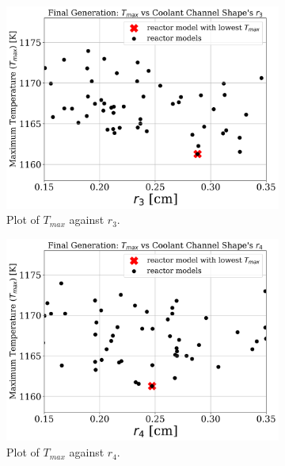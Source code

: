 \begin{frame}
\begin{figure}
\begin{subfigure}{0.3\textwidth}
            \label{fig:a-1e-r2} 
        \end{subfigure}
        \begin{subfigure}{0.3\textwidth}
            \includegraphics[width=\linewidth]{figures/a-1e-r3-pres.png}
            \caption{Plot of $T_{max}$ against $r_3$.}
            \label{fig:a-1e-r3} 
        \end{subfigure}
        \begin{subfigure}{0.3\textwidth}
            \includegraphics[width=\linewidth]{figures/a-1e-r4-pres.png}
            \caption{Plot of $T_{max}$ against $r_4$.}
            \label{fig:a-1e-r4} 
        \end{subfigure}
        \begin{subfigure}{0.3\textwidth}

\end{subfigure}
\end{figure}
\end{frame}
